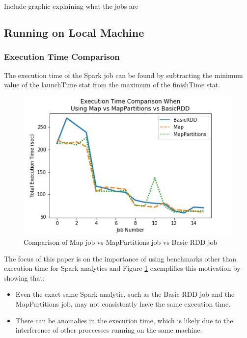 \documentclass[conference]{IEEEtran}
\begin{document}
Include graphic explaining what the jobs are

\subsection{Running on Local Machine}

\subsubsection{Execution Time Comparison}
The execution time of the Spark job can be found by subtracting the minimum value of the launchTime stat from the maximum of the finishTime stat.

\begin{figure}
    \includegraphics[width=\linewidth]{../python_scripts/images/mapVsMapPartitionsAllExecutionTime.png}
    \caption{Comparison of Map job vs MapPartitions job vs Basic RDD job}
    \label{fig:mapVMapPartitionsAllExecTime}
\end{figure}

The focus of this paper is on the importance of using benchmarks other than execution time for Spark analytics and Figure \ref{fig:mapVMapPartitionsAllExecTime} exemplifies this motivation by showing that:
\begin{itemize}
\item Even the exact same Spark analytic, such as the Basic RDD job and the MapPartitions job, may not consistently have the same execution time.
\item There can be anomalies in the execution time, which is likely due to the interference of other proccesses running on the same machine.
\end{itemize}
\end{document}

